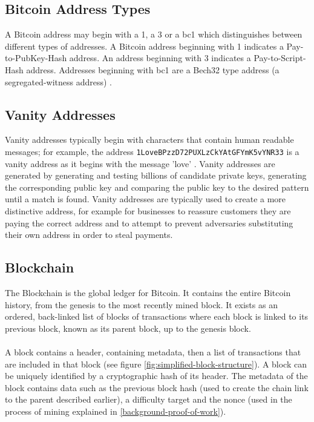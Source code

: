 \subsection{Bitcoin Address Types}\label{background-address-types}
A Bitcoin address may begin with a 1, a 3 or a bc1 which distinguishes between different types of addresses. A Bitcoin address beginning with 1 indicates a Pay-to-PubKey-Hash address. An address beginning with 3 indicates a Pay-to-Script-Hash address. Addresses beginning with bc1 are a Bech32 type address (a segregated-witness address) \cite{RefWorks:doc:5c39e80ae4b0854ae611b047}.

\subsection{Vanity Addresses}\label{background-vanity-addresses}
Vanity addresses typically begin with characters that contain human readable messages; for example, the address \texttt{1LoveBPzzD72PUXLzCkYAtGFYmK5vYNR33} is a vanity address as it begins with the message 'love' \cite{RefWorks:doc:5c39e80ae4b0854ae611b047}. Vanity addresses are generated by generating and testing billions of candidate private keys, generating the corresponding public key and comparing the public key to the desired pattern until a match is found. Vanity addresses are typically used to create a more distinctive address, for example for businesses to reassure customers they are paying the correct address and to attempt to prevent adversaries substituting their own address in order to steal payments. 

\subsection{Blockchain} \label{background-blockchain}
The Blockchain is the global ledger for Bitcoin. It contains the entire Bitcoin history, from the \gls{genesis} to the most recently mined block. It exists as an ordered, back-linked list of blocks of transactions \cite{RefWorks:doc:5c39e80ae4b0854ae611b047} where each block is linked to its previous block, known as its parent block, up to the genesis block. 
\\\\
A block contains a header, containing metadata, then a list of transactions that are included in that block \cite{RefWorks:doc:5c39e80ae4b0854ae611b047} (see figure \ref{fig:simplified-block-structure}). A block can be uniquely identified by a cryptographic hash of its header. The metadata of the block contains data such as the previous block hash (used to create the chain link to the parent described earlier), a difficulty target and the nonce (used in the process of mining explained in \ref{background-proof-of-work}).  


